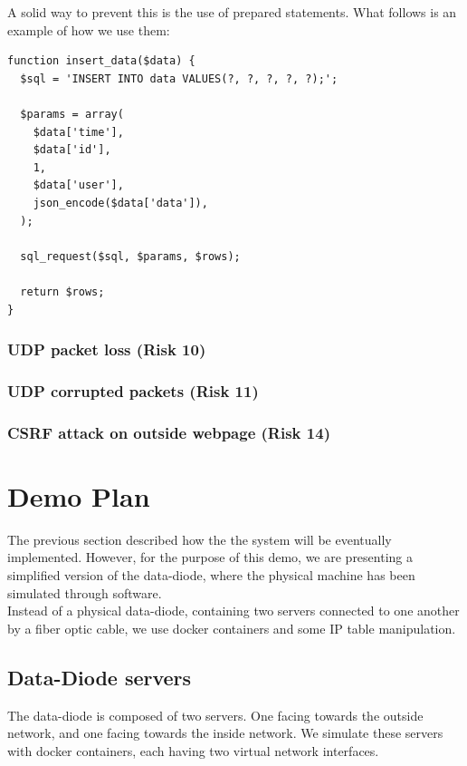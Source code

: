 \documentclass[a4paper,11pt]{article}
\begin{document}
A solid way to prevent this is the use of prepared statements. What follows is an example of how we use them:

\begin{lstlisting}[frame=single] 
function insert_data($data) {
  $sql = 'INSERT INTO data VALUES(?, ?, ?, ?, ?);';
  
  $params = array(
    $data['time'],
    $data['id'],
    1,
    $data['user'],
    json_encode($data['data']),
  );
  
  sql_request($sql, $params, $rows);
  
  return $rows;
}
\end{lstlisting}

\subsubsection{UDP packet loss (Risk 10)}

\subsubsection{UDP corrupted packets (Risk 11)}

\subsubsection{CSRF attack on outside webpage (Risk 14)}


\section{Demo Plan}
The previous section described how the the system will be eventually implemented. However, for the purpose of this demo, we are presenting a simplified version of the data-diode, where the physical machine has been simulated through software.\\

Instead of a physical data-diode, containing two servers connected to one another by a fiber optic cable, we use docker containers and some IP table manipulation.

\subsection{Data-Diode servers}
The data-diode is composed of two servers. One facing towards the outside network, and one facing towards the inside network. We simulate these servers with docker containers, each having two virtual network interfaces.\\
\end{document}
